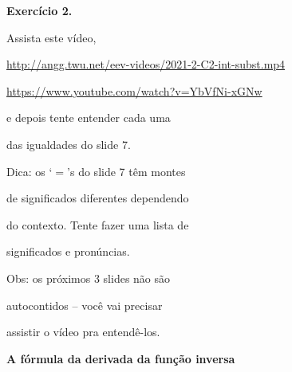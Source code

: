 \documentclass[oneside,12pt]{article}
\begin{document}
\newpage




{\bf Exercício 2.}

Assista este vídeo,

\ssk

{\footnotesize

\url{http://angg.twu.net/eev-videos/2021-2-C2-int-subst.mp4}

\url{https://www.youtube.com/watch?v=YbVfNi-xGNw}

}

e depois tente entender cada uma

das igualdades do slide 7.

\bsk

Dica: os `$=$'s do slide 7 têm montes

de significados diferentes dependendo

do contexto. Tente fazer uma lista de

significados e pronúncias.


\bsk

Obs: os próximos 3 slides não são

autocontidos -- você vai precisar

assistir o vídeo pra entendê-los.








\newpage



{\bf A fórmula da derivada da função inversa}

\end{document}
